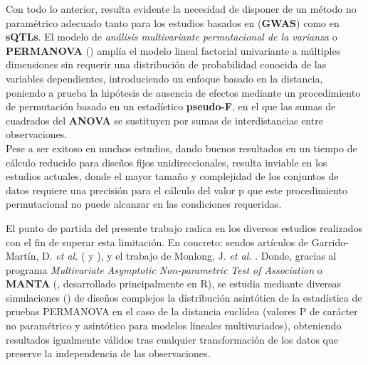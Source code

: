 \documentclass[IB,BIB]{TFUOC}%
\begin{document}
Con todo lo anterior, resulta evidente la necesidad de disponer de un método no paramétrico adecuado tanto para los estudios basados en (\textbf{GWAS}) como en \textbf{sQTLs}. El modelo de \textit{análisis multivariante permutacional de la varianza} o \textbf{PERMANOVA} (\cite{anderson_new_2001}) amplía el modelo lineal factorial univariante a múltiples dimensiones sin requerir una distribución de probabilidad conocida de las variables dependientes, introduciendo un enfoque basado en la distancia, poniendo a prueba la hipótesis de ausencia de efectos mediante un procedimiento de permutación basado en un estadístico \textbf{pseudo-F}, en el que las sumas de cuadrados del \textbf{ANOVA} se sustituyen por sumas de interdistancias entre observaciones.\\
Pese a ser exitoso en muchos estudios, dando buenos resultados en un tiempo de cálculo reducido para diseños fijos unidireccionales, resulta inviable en los estudios actuales, donde el mayor tamaño y complejidad de los conjuntos de datos requiere una precisión para el cálculo del valor p que este procedimiento permutacional no puede alcanzar en las condiciones requeridas.

El punto de partida del presente trabajo radica en los diversos estudios realizados con el fin de superar esta limitación. En concreto: sendos artículos de Garrido-Martín, D. \textit{et al.} (\cite{garrido-martin_fast_2022} y \cite{garrido-martin_identification_2021}), y el trabajo de Monlong, J. \textit{et al.} \cite{monlong_identification_2014}. Donde, gracias al programa \textit{Multivariate Asymptotic Non-parametric Test of Association} o \textbf{MANTA} (\cite{garrido-martin_manta_2023}, desarrollado principalmente en R), se estudia mediante diversas simulaciones (\cite{garrido-martin_manta-sim_2022}) de diseños complejos la distribución asintótica de la estadística de pruebas PERMANOVA en el caso de la distancia euclídea (valores P de carácter no paramétrico y asintótico para modelos lineales multivariados), obteniendo resultados igualmente válidos tras cualquier transformación de los datos que preserve la independencia de las observaciones.

\end{document}
